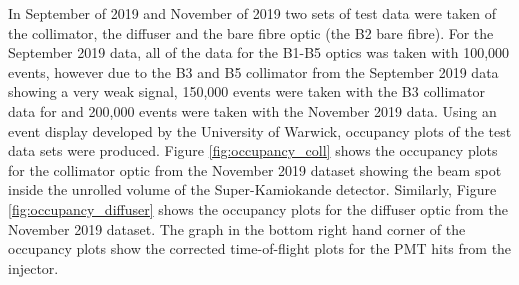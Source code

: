 In September of 2019 and November of 2019 two sets of test data were taken of the collimator, the diffuser and the bare fibre optic (the B2 bare fibre). For the September 2019 data, all of the data for the B1-B5 optics was taken with 100,000 events, however due to the B3 and B5 collimator from the September 2019 data showing a very weak signal, 150,000 events were taken with the B3 collimator data for and 200,000 events were taken with the November 2019 data. Using an event display developed by the University of Warwick, occupancy plots of the test data sets were produced. Figure \ref{fig:occupancy_coll} shows the occupancy plots for the collimator optic from the November 2019 dataset showing the beam spot inside the unrolled volume of the Super-Kamiokande detector. Similarly, Figure \ref{fig:occupancy_diffuser} shows the occupancy plots for the diffuser optic from the November 2019 dataset. The graph in the bottom right hand corner of the occupancy plots show the corrected time-of-flight plots for the PMT hits from the injector. 

